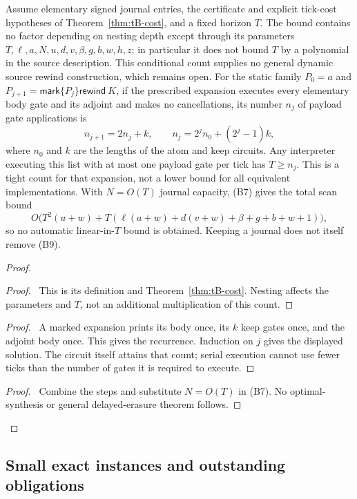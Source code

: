 \begin{proposition}\label{prop:tB-nesting}
Assume elementary signed journal entries, the certificate and explicit
tick-cost hypotheses of Theorem~\ref{thm:tB-cost}, and a fixed horizon
$T$. The bound contains no factor depending on nesting depth except
through its parameters $T,\ell,a,N,u,d,v,\beta,g,b,w,h,z$;
in particular it does not bound $T$ by a polynomial in the source
description. This conditional count supplies no general dynamic source
rewind construction, which remains open.
For the static family $P_0=a$ and
$P_{j+1}=\mathsf{mark}\{P_j\}\mathsf{rewind}\ K$, if the prescribed
expansion executes every elementary body gate and its adjoint and makes
no cancellations, its number $n_j$ of payload gate applications is
\[
 n_{j+1}=2n_j+k,\qquad n_j=2^jn_0+(2^j-1)k,                \tag{B9}
\]
where $n_0$ and $k$ are the lengths of the atom and keep circuits.
Any interpreter executing this list with at most one payload gate per
tick has $T\geq n_j$. This is a tight count for that expansion, not a
lower bound for all equivalent implementations. With $N=O(T)$ journal
capacity, (B7) gives the total scan bound
\[
 O\bigl(T^2(u+w)+
 T(\ell(a+w)+d(v+w)+\beta+g+b+w+1)\bigr),
\]
so no automatic linear-in-$T$ bound is obtained. Keeping a journal
does not itself remove (B9).
\end{proposition}
\begin{proof}
 \begin{proof}\pf\ This is its definition and
 Theorem~\ref{thm:tB-cost}. Nesting affects the parameters and $T$,
 not an additional multiplication of this count.\end{proof}
 \begin{proof}\pf\ A marked expansion prints its body once, its
 $k$ keep gates once, and the adjoint body once. This gives the
 recurrence. Induction on $j$ gives the displayed solution.
 The circuit itself attains that count; serial execution cannot use
 fewer ticks than the number of gates it is required to execute.\end{proof}
 \qedstep
 \begin{proof}\pf\ Combine the steps and substitute $N=O(T)$ in
 (B7). No optimal-synthesis or general delayed-erasure theorem follows.
\end{proof}
\end{proof}

\subsection{Small exact instances and outstanding obligations}

